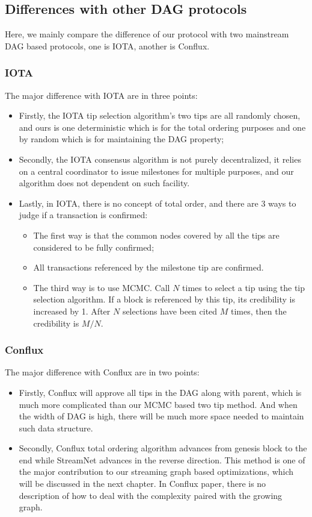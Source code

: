 \subsection{Differences with other DAG protocols}
Here, we mainly compare the difference of our protocol with two mainstream DAG based protocols, one is IOTA, another is Conflux.

\subsubsection{IOTA}
The major difference with IOTA are in three points:
\begin{itemize}
    \item Firstly, the IOTA tip selection algorithm's two tips are all randomly chosen, 
        and ours is one deterministic which is for the total ordering purposes and one by random which is for maintaining the DAG property; 
    \item Secondly, the IOTA consensus algorithm is not purely decentralized, 
        it relies on a central coordinator to issue milestones for multiple purposes, and our algorithm does not dependent on such facility. 
    \item Lastly, in IOTA, there is no concept of total order,
        and there are 3 ways to judge if a transaction is confirmed: 
    \begin{itemize}
        \item The first way is that the common nodes covered by all the tips are considered to be fully confirmed; 
        \item All transactions referenced by the milestone tip are confirmed.
        \item The third way is to use MCMC.
            Call $N$ times to select a tip using the tip selection algorithm.
            If a block is referenced by this tip, its credibility is increased by 1.
            After $N$ selections have been cited $M$ times, then the credibility is $M / N$.
    \end{itemize}
\end{itemize}

\subsubsection{Conflux}
The major difference with Conflux are in two points:
\begin{itemize}
    \item Firstly, Conflux will approve all tips in the DAG along with parent, which is much more complicated than our MCMC based two tip method. 
        And when the width of DAG is high, there will be much more space needed to maintain such data structure. 
    \item Secondly, Conflux total ordering algorithm advances from genesis block to the end while StreamNet advances in the reverse direction. 
        This method is one of the major contribution to our streaming graph based optimizations,
        which will be discussed in the next chapter. 
        In Conflux paper, there is no description of how to deal with the complexity paired with the growing graph.
\end{itemize}
